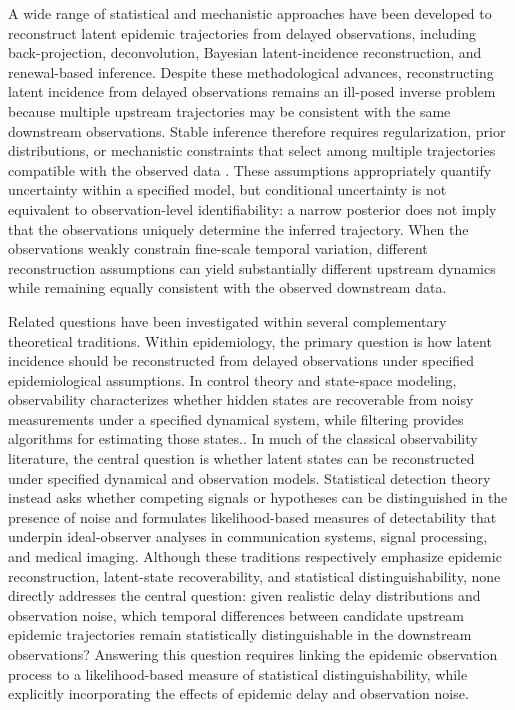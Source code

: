 A wide range of statistical and mechanistic approaches have been developed to reconstruct latent epidemic trajectories from delayed observations, including back-projection\cite{becker1991method}, deconvolution\cite{goldstein2009reconstructing}, Bayesian latent-incidence reconstruction\cite{chitwood2022reconstructing}, and renewal-based inference\cite{cori2013new, gostic2020practical}. Despite these methodological advances, reconstructing latent incidence from delayed observations remains an ill-posed inverse problem because multiple upstream trajectories may be consistent with the same downstream observations\cite{miller2022statistical}. Stable inference therefore requires regularization, prior distributions, or mechanistic constraints that select among multiple trajectories compatible with the observed data \cite{miller2022statistical, becker1991method, king2016statistical}. These assumptions appropriately quantify uncertainty within a specified model, but conditional uncertainty is not equivalent to observation-level identifiability: a narrow posterior does not imply that the observations uniquely determine the inferred trajectory. When the observations weakly constrain fine-scale temporal variation, different reconstruction assumptions can yield substantially different upstream dynamics while remaining equally consistent with the observed downstream data\cite{miller2022statistical,chitwood2022reconstructing}.

Related questions have been investigated within several complementary theoretical traditions. Within epidemiology, the primary question is how latent incidence should be reconstructed from delayed observations under specified epidemiological assumptions\cite{chitwood2022reconstructing, miller2022statistical}. In control theory and state-space modeling, observability characterizes whether hidden states are recoverable from noisy measurements under a specified dynamical system, while filtering provides algorithms for estimating those states.\cite{kalman1960new, ljung1998system}. In much of the classical observability literature, the central question is whether latent states can be reconstructed under specified dynamical and observation models. Statistical detection theory instead asks whether competing signals or hypotheses can be distinguished in the presence of noise and formulates likelihood-based measures of detectability that underpin ideal-observer analyses in communication systems, signal processing, and medical imaging\cite{green1966signal, barrett2013foundations, barrett1998objective}. Although these traditions respectively emphasize epidemic reconstruction, latent-state recoverability, and statistical distinguishability, none directly addresses the central question: given realistic delay distributions and observation noise, which temporal differences between candidate upstream epidemic trajectories remain statistically distinguishable in the downstream observations? Answering this question requires linking the epidemic observation process to a likelihood-based measure of statistical distinguishability, while explicitly incorporating the effects of epidemic delay and observation noise.

